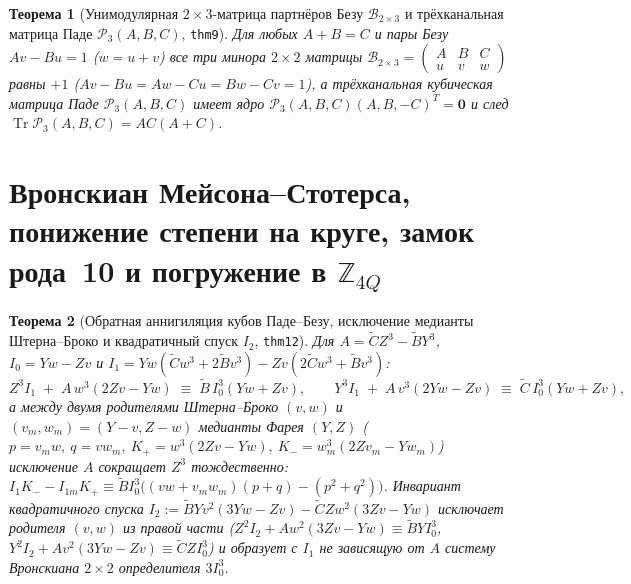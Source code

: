 \documentclass[11pt,a4paper]{article}
\theoremstyle{plain}
\newtheorem{theorem}{Теорема}[section]
\theoremstyle{definition}
\begin{document}
\begin{theorem}[Унимодулярная $2\times 3$-матрица партнёров Безу $\mathcal{B}_{2\times 3}$ и трёхканальная матрица Паде $\mathcal{P}_3(A,B,C)$, \texttt{thm9}]
\label{thm:main-9}
Для любых $A + B = C$ и пары Безу $A v - B u = 1$ ($w = u + v$) все три минора $2\times 2$ матрицы $\mathcal{B}_{2\times 3} = \begin{pmatrix} A & B & C \\ u & v & w \end{pmatrix}$ равны $+1$ ($Av-Bu = Aw-Cu = Bw-Cv = 1$), а трёхканальная кубическая матрица Паде $\mathcal{P}_3(A,B,C)$ имеет ядро $\mathcal{P}_3(A,B,C)(A,B,-C)^T = \mathbf{0}$ и след $\operatorname{Tr}\mathcal{P}_3(A,B,C) = A C(A+C)$.
\end{theorem}

\section{Вронскиан Мейсона--Стотерса, понижение степени на круге, замок рода~10 и погружение в \texorpdfstring{$\mathbb{Z}_{4Q}$}{Z\_4Q}}
\label{sec:universal-theorems}

\begin{theorem}[Обратная аннигиляция кубов Паде--Безу, исключение медианты Штерна--Броко и квадратичный спуск $I_2$, \texttt{thm12}]
\label{thm:reverse-pade-thm12}
Для $A = \widetilde{C}Z^3 - \widetilde{B}Y^3$, $I_0 = Yw - Zv$ и $I_1 = Yw(\widetilde{C}w^3+2\widetilde{B}v^3) - Zv(2\widetilde{C}w^3+\widetilde{B}v^3)$:
\begin{equation}
  \label{eq:reverse-pade-bezout}
  Z^3 I_1 \;+\; A\,w^3(2Zv - Yw) \;\equiv\; \widetilde{B}\,I_0^3(Yw + Zv),\qquad
  Y^3 I_1 \;+\; A\,v^3(2Yw - Zv) \;\equiv\; \widetilde{C}\,I_0^3(Yw + Zv),
\end{equation}
а между двумя родителями Штерна--Броко $(v,w)$ и $(v_m,w_m) = (Y-v,Z-w)$ медианты Фарея $(Y,Z)$ ($p = v_m w,\ q = v w_m,\ K_+ = w^3(2Zv-Yw),\ K_- = w_m^3(2Zv_m-Yw_m)$) исключение $A$ сокращает $Z^3$ тождественно: $I_1 K_- - I_{1m} K_+ \equiv \widetilde{B} I_0^3\bigl((vw + v_m w_m)(p+q) - (p^2+q^2)\bigr)$. Инвариант квадратичного спуска $I_2 := \widetilde{B}Yv^2(3Yw-Zv) - \widetilde{C}Zw^2(3Zv-Yw)$ исключает родителя $(v,w)$ из правой части ($Z^2 I_2 + A w^2(3Zv-Yw) \equiv \widetilde{B}Y I_0^3$, $Y^2 I_2 + A v^2(3Yw-Zv) \equiv \widetilde{C}Z I_0^3$) и образует с $I_1$ не зависящую от $A$ систему Вронскиана $2\times 2$ определителя $3 I_0^3$.
\end{theorem}
\end{document}
